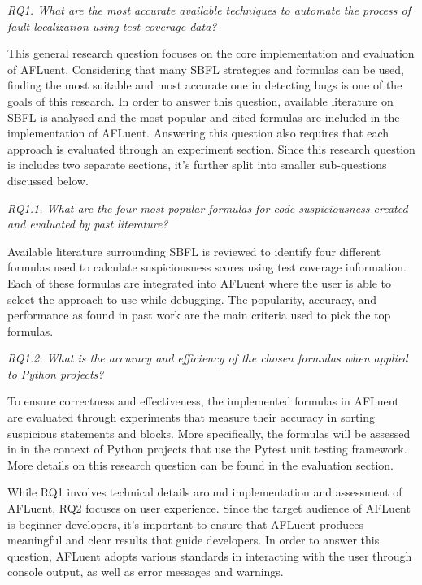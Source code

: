 \begin{center}
	\emph{RQ1. What are the most accurate available techniques to automate the process of
	fault localization using test coverage data?
	}
\end{center}

This general research question focuses on the core implementation and
evaluation of AFLuent. Considering that many SBFL strategies and formulas can be
used, finding the most suitable and most accurate one in detecting bugs is one
of the goals of this research. In order to answer this question,
available literature on SBFL is analysed and the most popular and cited formulas
are included in the implementation of AFLuent. Answering this question also
requires that each approach is evaluated through an experiment section.
Since this research question is includes two separate sections, it's further split into
smaller sub-questions discussed below.

\begin{center}
	\emph{RQ1.1. What are the four most popular formulas for code suspiciousness
	created and evaluated by past literature?
	}
\end{center}

Available literature surrounding SBFL is reviewed to identify four
different formulas used to calculate suspiciousness scores using test coverage
information. Each of these formulas are integrated into AFLuent where the user
is able to select the approach to use while debugging. The popularity, accuracy,
and performance as found in past work are the main criteria used to pick the top
formulas.


\begin{center}
	\emph{RQ1.2.  What is the accuracy and efficiency of the chosen
	formulas when applied to Python projects?
	}
\end{center}

To ensure correctness and effectiveness, the implemented formulas in AFLuent are
evaluated through experiments that measure their accuracy in sorting suspicious
statements and blocks. More specifically, the formulas will be assessed in in
the context of Python projects that use the Pytest unit testing framework.
More details on this research question can be found in the evaluation section.

While RQ1 involves technical details around implementation and assessment of
AFLuent, RQ2 focuses on user experience. Since the target audience of AFLuent is
beginner developers, it's important to ensure that AFLuent produces meaningful
and clear results that guide developers. In order to answer this question,
AFLuent adopts various standards in interacting with the user through console
output, as well as error messages and warnings.

